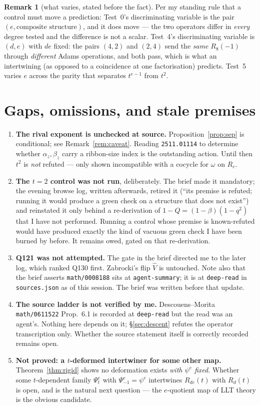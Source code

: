 \documentclass[11pt]{article}
\theoremstyle{definition}
\newtheorem{remark}[theorem]{Remark}
\begin{document}
\begin{remark}[what varies, stated before the fact]
Per my standing rule that a control must move a prediction: Test~0's discriminating variable
is the pair $(e,\text{composite structure})$, and it does move --- the two operators differ
in \emph{every} degree tested and the difference is not a scalar.  Test~4's discriminating
variable is $(d,e)$ with $de$ fixed: the pairs $(4,2)$ and $(2,4)$ send the \emph{same}
$R_8(-1)$ through \emph{different} Adams operations, and both pass, which is what an
intertwining (as opposed to a coincidence at one factorisation) predicts.  Test~5 varies $e$
across the parity that separates $t^{e-1}$ from $t^{2}$.
\end{remark}

\section{Gaps, omissions, and stale premises}\label{sec:gaps}

\begin{enumerate}
\item \textbf{The rival exponent is unchecked at source.}  Proposition~\ref{prop:sep} is
conditional; see Remark~\ref{rem:caveat}.  Reading \texttt{2511.01114} to determine whether
$\alpha_z,\beta_z$ carry a ribbon-size index is the outstanding action.  Until then $t^{2}$
is \emph{not} refuted --- only shown incompatible with a cocycle for $\omega$ on $R_e$.
\item \textbf{The $t=2$ control was not run}, deliberately.  The brief made it mandatory; the
evening browse log, written afterwards, retired it (``its premise is refuted; running it
would produce a green check on a structure that does not exist'') and reinstated it only
behind a re-derivation of $1-Q=(1-\beta)(1-q^{2})$ that I have not performed.  Running a
control whose premise is known-refuted would have produced exactly the kind of vacuous green
check I have been burned by before.  It remains owed, gated on that re-derivation.
\item \textbf{Q121 was not attempted.}  The gate in the brief directed me to the later log,
which ranked Q130 first.  Zabrocki's flip $\hat V$ is untouched.  Note also that the brief
asserts \texttt{math/0008188} sits at \texttt{agent-summary}; it is at \texttt{deep-read} in
\texttt{sources.json} as of this session.  The brief was written before that update.
\item \textbf{The source ladder is not verified by me.}  Descouens--Morita
\texttt{math/0611522} Prop.~6.1 is recorded at \texttt{deep-read} but the read was an
agent's.  Nothing here depends on it; \S\ref{sec:descent} refutes the operator transcription
only.  Whether the source statement itself is correctly recorded remains open.
\item \textbf{Not proved: a $t$-deformed intertwiner for some other map.}
Theorem~\ref{thm:rigid} shows no deformation exists \emph{with $\psi^{e}$ fixed}.  Whether
some $t$-dependent family $\Psi^{e}_t$ with $\Psi^{e}_{-1}=\psi^{e}$ intertwines
$R_{de}(t)$ with $R_d(t)$ is open, and is the natural next question --- the $e$-quotient map
of LLT theory is the obvious candidate.
\end{enumerate}
\end{document}

